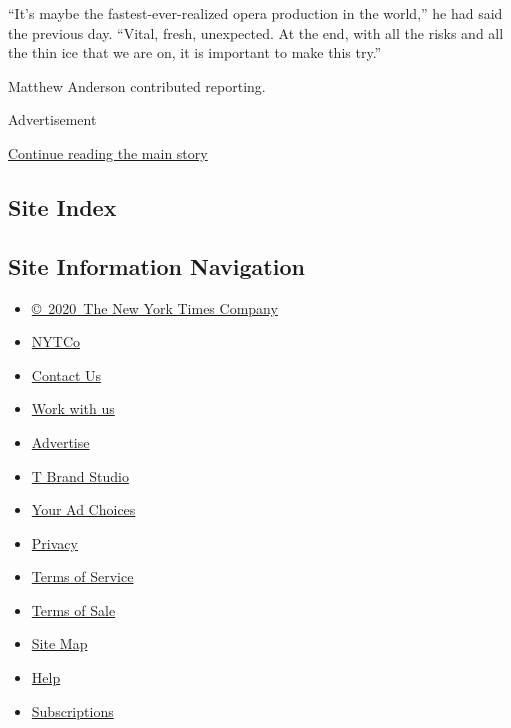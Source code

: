 ``It's maybe the fastest-ever-realized opera production in the world,''
he had said the previous day. ``Vital, fresh, unexpected. At the end,
with all the risks and all the thin ice that we are on, it is important
to make this try.''

Matthew Anderson contributed reporting.

Advertisement

\protect\hyperlink{after-bottom}{Continue reading the main story}

\hypertarget{site-index}{%
\subsection{Site Index}\label{site-index}}

\hypertarget{site-information-navigation}{%
\subsection{Site Information
Navigation}\label{site-information-navigation}}

\begin{itemize}
\tightlist
\item
  \href{https://help.nytimes3xbfgragh.onion/hc/en-us/articles/115014792127-Copyright-notice}{©~2020~The
  New York Times Company}
\end{itemize}

\begin{itemize}
\tightlist
\item
  \href{https://www.nytco.com/}{NYTCo}
\item
  \href{https://help.nytimes3xbfgragh.onion/hc/en-us/articles/115015385887-Contact-Us}{Contact
  Us}
\item
  \href{https://www.nytco.com/careers/}{Work with us}
\item
  \href{https://nytmediakit.com/}{Advertise}
\item
  \href{http://www.tbrandstudio.com/}{T Brand Studio}
\item
  \href{https://www.nytimes3xbfgragh.onion/privacy/cookie-policy\#how-do-i-manage-trackers}{Your
  Ad Choices}
\item
  \href{https://www.nytimes3xbfgragh.onion/privacy}{Privacy}
\item
  \href{https://help.nytimes3xbfgragh.onion/hc/en-us/articles/115014893428-Terms-of-service}{Terms
  of Service}
\item
  \href{https://help.nytimes3xbfgragh.onion/hc/en-us/articles/115014893968-Terms-of-sale}{Terms
  of Sale}
\item
  \href{https://spiderbites.nytimes3xbfgragh.onion}{Site Map}
\item
  \href{https://help.nytimes3xbfgragh.onion/hc/en-us}{Help}
\item
  \href{https://www.nytimes3xbfgragh.onion/subscription?campaignId=37WXW}{Subscriptions}
\end{itemize}
